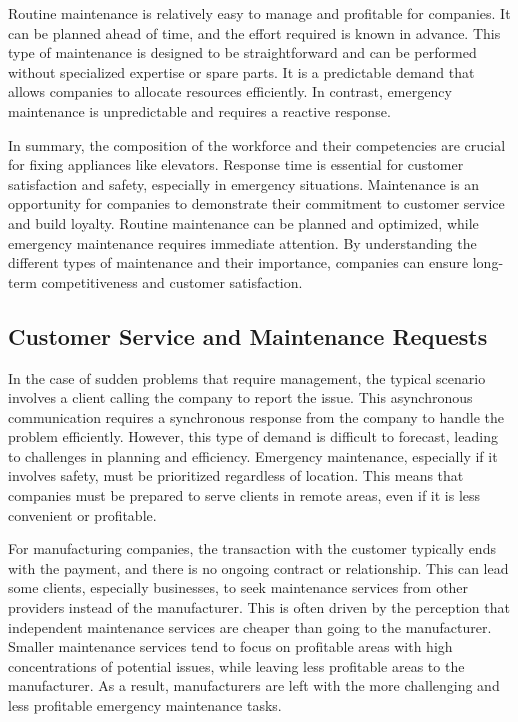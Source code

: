 
Routine maintenance is relatively easy to manage and profitable for
companies. It can be planned ahead of time, and the effort required is
known in advance. This type of maintenance is designed to be
straightforward and can be performed without specialized expertise or
spare parts. It is a predictable demand that allows companies to
allocate resources efficiently. In contrast, emergency maintenance is
unpredictable and requires a reactive response.

In summary, the composition of the workforce and their competencies are
crucial for fixing appliances like elevators. Response time is essential
for customer satisfaction and safety, especially in emergency
situations. Maintenance is an opportunity for companies to demonstrate
their commitment to customer service and build loyalty. Routine
maintenance can be planned and optimized, while emergency maintenance
requires immediate attention. By understanding the different types of
maintenance and their importance, companies can ensure long-term
competitiveness and customer satisfaction.

\subsection{Customer Service and Maintenance
    Requests}\label{customer-service-and-maintenance-requests}

In the case of sudden problems that require management, the typical
scenario involves a client calling the company to report the issue. This
asynchronous communication requires a synchronous response from the
company to handle the problem efficiently. However, this type of demand
is difficult to forecast, leading to challenges in planning and
efficiency. Emergency maintenance, especially if it involves safety,
must be prioritized regardless of location. This means that companies
must be prepared to serve clients in remote areas, even if it is less
convenient or profitable.


For manufacturing companies, the transaction with the customer typically
ends with the payment, and there is no ongoing contract or relationship.
This can lead some clients, especially businesses, to seek maintenance
services from other providers instead of the manufacturer. This is often
driven by the perception that independent maintenance services are
cheaper than going to the manufacturer. Smaller maintenance services
tend to focus on profitable areas with high concentrations of potential
issues, while leaving less profitable areas to the manufacturer. As a
result, manufacturers are left with the more challenging and less
profitable emergency maintenance tasks.

